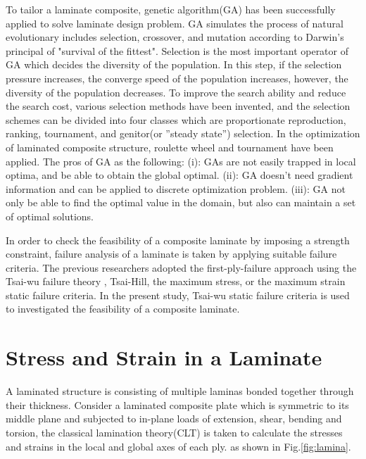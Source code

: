 \documentclass[Afour,sageh,times]{sagej}
\begin{document}
To tailor a laminate composite, genetic algorithm(GA) has been successfully
applied to solve laminate design
problem\cite{riche1993optimization,nagendra1996improved,sadagopan1998application,todoroki1998stacking,liu2000permutation,sivakumar1998optimum,walker2003technique,lin2004stacking,kang2005minimum,murugan2007target,akbulut2008optimum}.
GA simulates the process of natural evolutionary includes selection, crossover, 
and mutation according to Darwin's principal of "survival of the fittest".
Selection is the most important operator  of GA which decides the diversity of
the population.  In this step, if the selection pressure increases, the
converge speed of the population increases, however, the diversity of the
population decreases.  To improve the search ability and reduce the search cost,
various selection methods have been invented, and the selection schemes can be
divided into four classes which are proportionate reproduction, ranking,
tournament, and genitor(or ”steady state”) selection. In the optimization of
laminated composite structure, roulette wheel\cite{riche1993optimization,seresta2007optimal} and
tournament\cite{lin2004stacking} have been applied.
The pros of GA as the following: (i): GAs are not easily trapped in local
optima, and be able to obtain the global optimal. (ii): GA doesn't need
gradient information and can be applied to discrete optimization problem.
(iii): GA not only be able to find the optimal value in the domain, but also
can maintain a set of optimal solutions.


In order to check the feasibility of a composite laminate by imposing a
strength constraint, failure analysis of a laminate is taken by applying
suitable failure criteria. The previous researchers adopted the
first-ply-failure approach using the Tsai-wu failure theory
\cite{massard1984computer,reddy1987first,fang1993design,soeiro1994multilevel,pelletier2006multi,jadhav2007parametric,omkar2008artificial,choudhury2019failure},
Tsai-Hill\cite{martin1987optimum,soares1995discrete}, the maximum
stress\cite{jadhav2007parametric,omkar2008artificial}, or the maximum
strain\cite{watkins1987multicriteria} static failure criteria. In the present
study, Tsai-wu static failure criteria is used to investigated the feasibility
of a composite laminate.

\section{Stress and Strain in a Laminate}
A laminated structure is consisting of multiple laminas bonded together through
their thickness.  Consider a laminated composite plate which is symmetric to
its middle plane and subjected to in-plane loads of extension, shear, bending
and torsion,  the classical lamination theory(CLT) is taken to calculate the
stresses and strains in the local and global axes of each ply. as shown in
Fig.\ref{fig:lamina}.
\end{document}
